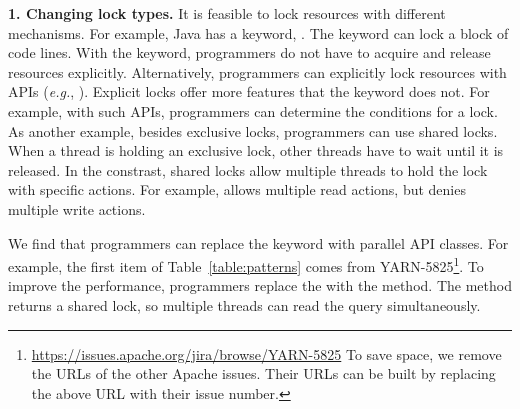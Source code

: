 \noindent
\textbf{1. Changing lock types.} It is feasible to lock resources with different mechanisms. For example, Java has a keyword, . The keyword can lock a block of code lines. With the keyword, programmers do not have to acquire and release resources explicitly. Alternatively, programmers can explicitly lock resources with APIs (\emph{e.g.}, ). Explicit locks offer more features that the  keyword does not. For example, with such APIs, programmers can determine the conditions for a lock. As another example, besides exclusive locks, programmers can use shared locks. When a thread is holding an exclusive lock, other threads have to wait until it is released. In the constrast, shared locks allow multiple threads to hold the lock with specific actions. For example,  allows multiple read actions, but denies multiple write actions.%


We find that programmers can replace the  keyword with parallel API classes. For example, the first item of Table~\ref{table:patterns} comes from YARN-5825\footnote{\url{https://issues.apache.org/jira/browse/YARN-5825} To save space, we remove the URLs of the other Apache issues. Their URLs can be built by replacing the above URL with their issue number.}. To improve the performance, programmers replace the  with the  method. The method returns a shared lock, so multiple threads can read the query simultaneously.

